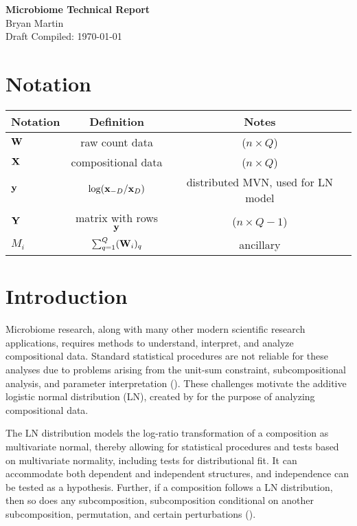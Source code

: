 \documentclass{template}
\begin{document}
\begin{center}
  {\Large \textbf{Microbiome Technical Report}}\\
  {\large Bryan Martin} \\ 
  {Draft Compiled: \today} 
\end{center}

\setcounter{section}{-1}

\section{Notation}
 \begin{table}[ht]
\centering
\begin{tabular}{l|c|c}
\textbf{Notation} & \textbf{Definition} & \textbf{Notes} \\
  \hline \hline
$\mathbf{W}$ & raw count data & ($n\times Q$)\\
$\mathbf{X}$ & compositional data & ($n\times Q$)\\
$\mathbf{y}$ & $\log(\mathbf{x}_{-D}/\mathbf{x}_{D})$ & distributed MVN, used for LN model\\
$\mathbf{Y}$ & matrix with rows $\mathbf{y}$ & ($n \times Q-1$) \\
$M_i$ & $\sum_{q=1}^{Q} (\mathbf{W}_i)_q$ & ancillary
\end{tabular}
\end{table}

\section{Introduction}

Microbiome research, along with many other modern scientific research applications, requires methods to understand, interpret, and analyze compositional data. Standard statistical procedures are not reliable for these analyses due to problems arising from the unit-sum constraint, subcompositional analysis, and parameter interpretation (\cite{aitchison1986statistical}). These challenges motivate the additive logistic normal distribution (LN), created by \cite{aitchison1986statistical} for the purpose of analyzing compositional data.

The LN distribution models the log-ratio transformation of a composition as multivariate normal, thereby allowing for statistical procedures and tests based on multivariate normality, including tests for distributional fit. It can accommodate both dependent and independent structures, and independence can be tested as a hypothesis. Further, if a composition follows a LN distribution, then so does any subcomposition, subcomposition conditional on another subcomposition, permutation, and certain perturbations (\cite{aitchison1986statistical}). 
\end{document}
